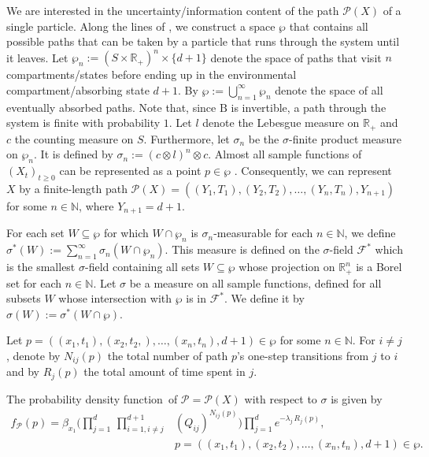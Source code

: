 \documentclass[smallextended]{svjour3}
\renewcommand{\tens}[1]{\mathrm{#1}}
\newcommand{\R}{\mathbb{R}}
\newcommand{\N}{\mathbb{N}}
\newcommand{\prodl}{\prod\limits}
\newcommand{\pdf}{probability density function}
\begin{document}
We are interested in the uncertainty/information content of the path $\mathcal{P}(X)$ of a single particle.
Along the lines of \citet{Albert1962AMS}, we construct a space $\wp$ that contains all possible paths that can be taken by a particle that runs through the system until it leaves.
Let $\wp_n:=(S\times\R_+)^n\times\{d+1\}$ denote the space of paths that visit $n$ compartments/states before ending up in the environmental compartment/absorbing state $d+1$.
By $\wp:=\bigcup_{n=1}^{\infty}\wp_n$ denote the space of all eventually absorbed paths.
Note that, since $\tens{B}$ is invertible, a path through the system is finite with probability $1$.
Let $l$ denote the Lebesgue measure on $\R_+$ and $c$ the counting measure on $S$.
Furthermore, let $\sigma_n$ be the $\sigma$-finite product measure on $\wp_n$.
It is defined by $\sigma_n:=(c\otimes l)^n \otimes c$.
Almost all sample functions of $(X_t)_{t\geq0}$ can be represented as a point $p\in\wp$ \citep[Chapter~VI]{Doob1953}.
Consequently, we can represent $X$ by a finite-length path $\mathcal{P}(X)=((Y_1,T_1),(Y_2,T_2),\ldots,(Y_n,T_n),Y_{n+1})$ for some $n\in\N$, where $Y_{n+1}=d+1$.

For each set $W\subseteq\wp$ for which $W\cap \wp_n$ is $\sigma_n$-measurable for each $n\in\N$, we define $\sigma^\ast(W) := \sum_{n=1}^{\infty} \sigma_n(W\cap\wp_n)$.
This measure is defined on the $\sigma$-field $\mathcal{F}^\ast$ which is the smallest $\sigma$-field containing all sets $W\subseteq\wp$ whose projection on $\R^n_+$ is a Borel set for each $n\in\N$.
Let $\sigma$ be a measure on all sample functions, defined for all subsets $W$ whose intersection with $\wp$ is in $\mathcal{F}^\ast$. 
We define it by $\sigma(W):=\sigma^*(W\cap\wp)$.

Let $p=((x_1,t_1),(x_2,t_2,),\ldots,(x_n,t_n),d+1)\in\wp$ for some $n\in\N$.
For $i\neq j$, denote by $N_{ij}(p)$ the total number of path $p$'s one-step transitions from $j$ to $i$ and by $R_j(p)$ the total amount of time spent in $j$.

\begin{mytheorem}\label{theorem:path_pdf}
	The \pdf\ of $\mathcal{P}=\mathcal{P}(X)$ with respect to $\sigma$ is given by
	\begin{equation}
    \begin{aligned}
      f_{\mathcal{P}}(p) = \beta_{x_1}\Bigg(\prodl_{j=1}^d\,\prodl_{i=1,i\neq j}^{d+1} &(Q_{ij})^{N_{ij}(p)}\Bigg)\prodl_{j=1}^d e^{-\lambda_j\,R_j(p)},\\
      & p=((x_1,t_1),(x_2,t_2),\ldots,(x_n,t_n),d+1)\in\wp.
    \end{aligned}
	\end{equation}
\end{mytheorem}
\end{document}

